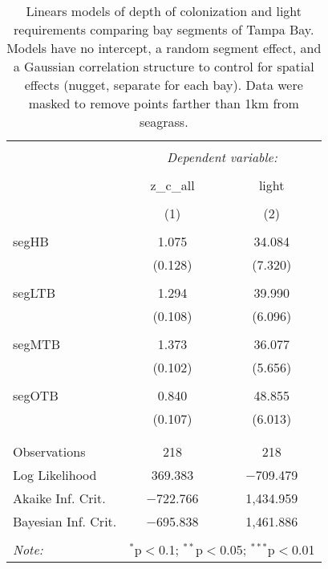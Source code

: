 \documentclass[letterpaper,12pt]{article}\usepackage[]{graphicx}\usepackage[]{color}
\begin{document}
\begin{table}[!htbp] \centering 
  \caption{Linears models of depth of colonization and light requirements comparing bay segments of Tampa Bay.  Models have no intercept, a random segment effect, and a Gaussian correlation structure to control for spatial effects (nugget, separate for each bay). Data were masked to remove points farther than 1km from seagrass.} 
  \label{} 
\begin{tabular}{@{\extracolsep{5pt}}lcc} 
\\[-1.8ex]\hline 
\hline \\[-1.8ex] 
 & \multicolumn{2}{c}{\textit{Dependent variable:}} \\ 
\cline{2-3} 
\\[-1.8ex] & z\_c\_all & light \\ 
\\[-1.8ex] & (1) & (2)\\ 
\hline \\[-1.8ex] 
 segHB & 1.075 & 34.084 \\ 
  & (0.128) & (7.320) \\ 
  & & \\ 
 segLTB & 1.294 & 39.990 \\ 
  & (0.108) & (6.096) \\ 
  & & \\ 
 segMTB & 1.373 & 36.077 \\ 
  & (0.102) & (5.656) \\ 
  & & \\ 
 segOTB & 0.840 & 48.855 \\ 
  & (0.107) & (6.013) \\ 
  & & \\ 
\hline \\[-1.8ex] 
Observations & 218 & 218 \\ 
Log Likelihood & 369.383 & $-$709.479 \\ 
Akaike Inf. Crit. & $-$722.766 & 1,434.959 \\ 
Bayesian Inf. Crit. & $-$695.838 & 1,461.886 \\ 
\hline 
\hline \\[-1.8ex] 
\textit{Note:}  & \multicolumn{2}{r}{$^{*}$p$<$0.1; $^{**}$p$<$0.05; $^{***}$p$<$0.01} \\ 
\end{tabular} 
\end{table} 
\end{document}
